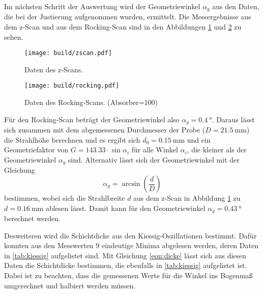 Im nächsten Schritt der Auswertung wird der Geometriewinkel $\alpha_g$ aus den Daten, die bei der Justierung aufgenommen wurden, ermittelt. Die Messergebnisse aus dem z-Scan und aus dem Rocking-Scan sind in den Abbildungen \ref{fig:z} und \ref{fig:rocking} zu sehen. 
  \begin{figure}[H]
    \centering
    \texttt{[image: build/zscan.pdf]}
    \caption{Daten des z-Scans.}
    \label{fig:z}
  \end{figure}

  \begin{figure}[H]
    \centering
    \texttt{[image: build/rocking.pdf]}
    \caption{Daten des Rocking-Scans. (Absorber=100)}
    \label{fig:rocking}
  \end{figure}


Für den Rocking-Scan beträgt der Geometriewinkel also $\alpha_g = \SI{0.4}{\degree}$. Daraus lässt sich zusammen mit dem abgemessenen Durchmesser der Probe ($D = \SI{21.5}{\milli\metre}$) die Strahlhöhe berechnen und es ergibt sich $d_0 = \SI{0.15}{\milli\meter}$ und ein Geometriefaktor von $G = \num{143.33} \cdot \sin \alpha_i$ für alle Winkel $\alpha_i$, die kleiner als der Geometriewinkel $\alpha_g$ sind.
Alternativ lässt sich der Geometriewinkel mit der Gleichung 
\begin{equation*}
  \alpha_g = \arcsin\left( \frac{d}{D} \right)
\end{equation*}
bestimmen, wobei sich die Strahlbreite $d$ aus dem z-Scan in Abbildung \ref{fig:z} zu $d = \SI{0.16}{\milli\meter}$ ablesen lässt.
Damit kann für den Geometriewinkel $\alpha_g = \SI{0.43}{\degree}$ berechnet werden.

Desweiteren wird die Schichtdicke aus den Kiessig-Oszillationen bestimmt. Dafür konnten aus den Messwerten 9 eindeutige Minima abgelesen werden, deren Daten in \autoref{tab:kiessig} aufgelistet sind. Mit Gleichung \autoref{eqn:dicke} lässt sich aus diesen Daten die Schichtdicke bestimmen, die ebenfalls in \autoref{tab:kiessig} aufgelistet ist. Dabei ist zu beachten, dass die gemessenen Werte für die Winkel ins Bogenmaß umgerechnet und halbiert werden müssen.

